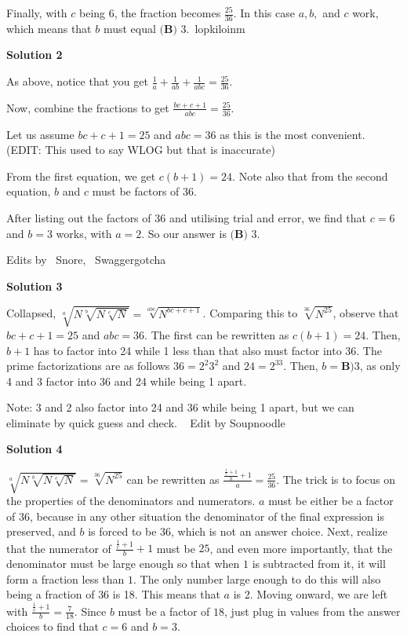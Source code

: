 \begin{enumerate}
 Finally, with $c$ being $6$, the fraction becomes $\frac{25}{36}$. In this case $a, b,$ and $c$ work, which means that $b$ must equal $\boxed{\textbf{(B) } 3.}$~lopkiloinm

 



\textbf{Solution 2}

As above, notice that you get $\frac{1}{a}+\frac{1}{ab}+\frac{1}{abc}=\frac{25}{36}.$ 

 Now, combine the fractions to get $\frac{bc+c+1}{abc}=\frac{25}{36}$.

 Let us assume $bc+c+1=25$ and $abc=36$ as this is the most convenient. (EDIT: This used to say WLOG but that is inaccurate)

 From the first equation, we get $c(b+1)=24$. Note also that from the second equation, $b$ and $c$ must be factors of 36.

 After listing out the factors of 36 and utilising trial and error, we find that $c=6$ and $b=3$ works, with $a=2$. So our answer is $\boxed{\textbf{(B) } 3.}$

 Edits by ~Snore, ~Swaggergotcha

 



\textbf{Solution 3}

Collapsed, $\sqrt[a]{N\sqrt[b]{N\sqrt[c]{N}}} = \sqrt[abc]{N^{bc+c+1}}$. Comparing this to $\sqrt[36]{N^{25}}$, observe that $bc+c+1=25$ and $abc=36$. The first can be rewritten as $c(b+1)=24$. Then, $b+1$ has to factor into 24 while 1 less than that also must factor into 36. The prime factorizations are as follows $36=2^2 3^2$ and $24=2^33$. Then, $b=\boxed{\textbf{B)}3}$, as only 4 and 3 factor into 36 and 24 while being 1 apart.

 Note: 3 and 2 also factor into 24 and 36 while being 1 apart, but we can eliminate by quick guess and check. ~ Edit by Soupnoodle

 



\textbf{Solution 4}

$\sqrt[a]{N\sqrt[b]{N\sqrt[c]{N}}} = \sqrt[36]{N^{25}}$ can be rewritten as $\frac{\frac{\frac{1}{c}+1}{b}+1}{a} = \frac{25}{36}$. The trick is to focus on the properties of the denominators and numerators. $a$ must be either be a factor of 36, because in any other situation the denominator of the final expression is preserved, and $b$ is forced to be 36, which is not an answer choice. Next, realize that the numerator of $\frac{\frac{1}{c}+1}{b}+1$ must be $25$, and even more importantly, that the denominator must be large enough so that when $1$ is subtracted from it, it will form a fraction less than $1$. The only number large enough to do this will also being a fraction of $36$ is 18. This means that $a$ is 2. Moving onward, we are left with $\frac{\frac{1}{c}+1}{b} = \frac{7}{18}$. Since $b$ must be a factor of $18$, just plug in values from the answer choices to find that $c=6$ and $b=3$.


\end{enumerate}
